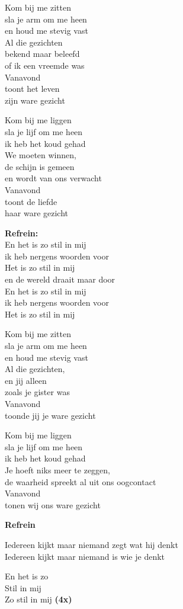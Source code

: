 Kom bij me zitten\\
sla je arm om me heen\\
en houd me stevig vast\\
Al die gezichten\\
bekend maar beleefd\\
of ik een vreemde was\\
Vanavond\\
toont het leven\\
zijn ware gezicht

Kom bij me liggen\\
sla je lijf om me heen\\
ik heb het koud gehad\\
We moeten winnen,\\
de schijn is gemeen\\
en wordt van ons verwacht\\
Vanavond\\
toont de liefde\\
haar ware gezicht

\textbf{Refrein:}\\
En het is zo stil in mij\\
ik heb nergens woorden voor\\
Het is zo stil in mij\\
en de wereld draait maar door\\
En het is zo stil in mij\\
ik heb nergens woorden voor\\
Het is zo stil in mij

Kom bij me zitten\\
sla je arm om me heen\\
en houd me stevig vast\\
Al die gezichten,\\
en jij alleen\\
zoals je gister was\\
Vanavond\\
toonde jij je ware gezicht

Kom bij me liggen\\
sla je lijf om me heen\\
ik heb het koud gehad\\
Je hoeft niks meer te zeggen,\\
de waarheid spreekt al uit ons oogcontact\\
Vanavond\\
tonen wij ons ware gezicht

\textbf{Refrein}

Iedereen kijkt maar niemand zegt wat hij denkt\\
Iedereen kijkt maar niemand is wie je denkt

En het is zo\\
Stil in mij\\
Zo stil in mij \textbf{(4x)}
